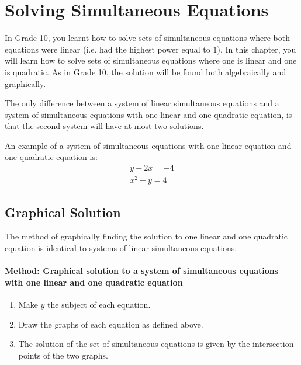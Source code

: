 \chapter{Solving Simultaneous Equations}
\label{m:se:sim11}


In Grade 10, you learnt how to solve sets of simultaneous equations where both equations were linear (i.e. had the highest power equal to $1$). In this chapter, you will learn how to solve sets of simultaneous equations where one is linear and one is quadratic. As in Grade 10, the solution will be found both algebraically and graphically.

The only difference between a system of linear simultaneous equations and a system of simultaneous equations with one linear and one quadratic equation, is that the second system will have at most two solutions.

An example of a system of simultaneous equations with one linear equation and one quadratic equation is:
\begin{eqnarray}
\label{sim11:example}
y-2x=-4\\
x^2+y=4 \nonumber
\end{eqnarray}

\section{Graphical Solution}
The method of graphically finding the solution to one linear and one quadratic equation is identical to systems of linear simultaneous equations.

\subsubsection{Method: Graphical solution to a system of simultaneous equations
with one linear and one quadratic equation}{
\begin{enumerate}
\item{Make $y$ the subject of each equation.}
\item{Draw the graphs of each equation as defined above.}
\item{The solution of the set of simultaneous equations is given by the intersection points of the two graphs.}
\end{enumerate}}

